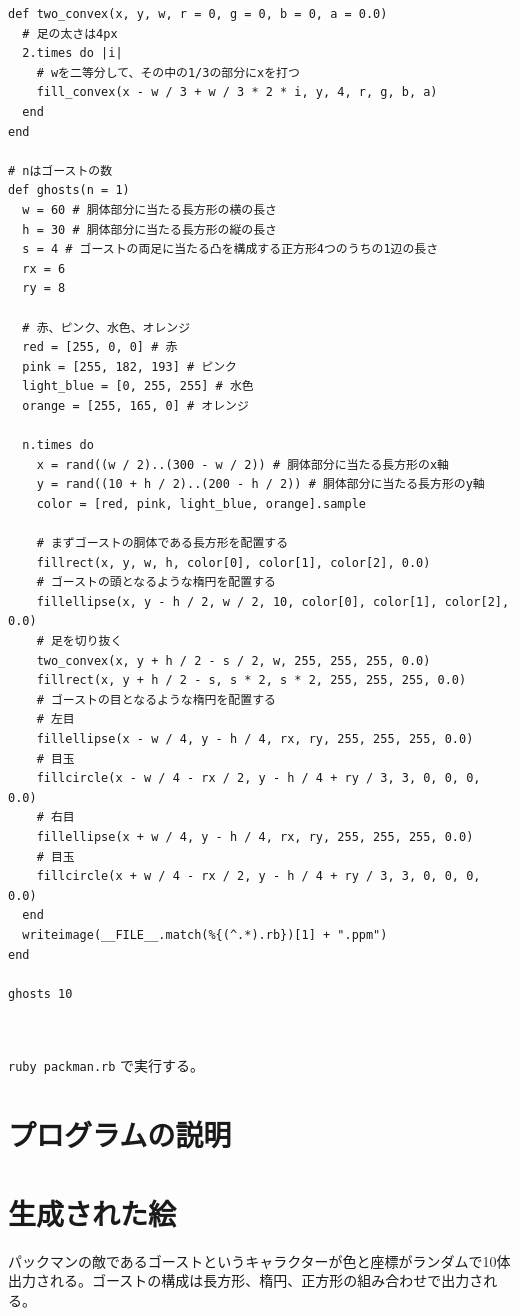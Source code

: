 \documentclass[12pt,a4j]{jarticle}
\begin{document}
\begin{verbatim}
def two_convex(x, y, w, r = 0, g = 0, b = 0, a = 0.0)
  # 足の太さは4px
  2.times do |i|
    # wを二等分して、その中の1/3の部分にxを打つ
    fill_convex(x - w / 3 + w / 3 * 2 * i, y, 4, r, g, b, a)
  end
end

# nはゴーストの数
def ghosts(n = 1)
  w = 60 # 胴体部分に当たる長方形の横の長さ
  h = 30 # 胴体部分に当たる長方形の縦の長さ
  s = 4 # ゴーストの両足に当たる凸を構成する正方形4つのうちの1辺の長さ
  rx = 6
  ry = 8

  # 赤、ピンク、水色、オレンジ
  red = [255, 0, 0] # 赤
  pink = [255, 182, 193] # ピンク
  light_blue = [0, 255, 255] # 水色
  orange = [255, 165, 0] # オレンジ

  n.times do
    x = rand((w / 2)..(300 - w / 2)) # 胴体部分に当たる長方形のx軸
    y = rand((10 + h / 2)..(200 - h / 2)) # 胴体部分に当たる長方形のy軸
    color = [red, pink, light_blue, orange].sample

    # まずゴーストの胴体である長方形を配置する
    fillrect(x, y, w, h, color[0], color[1], color[2], 0.0)
    # ゴーストの頭となるような楕円を配置する
    fillellipse(x, y - h / 2, w / 2, 10, color[0], color[1], color[2], 0.0)
    # 足を切り抜く
    two_convex(x, y + h / 2 - s / 2, w, 255, 255, 255, 0.0)
    fillrect(x, y + h / 2 - s, s * 2, s * 2, 255, 255, 255, 0.0)
    # ゴーストの目となるような楕円を配置する
    # 左目
    fillellipse(x - w / 4, y - h / 4, rx, ry, 255, 255, 255, 0.0)
    # 目玉
    fillcircle(x - w / 4 - rx / 2, y - h / 4 + ry / 3, 3, 0, 0, 0, 0.0)
    # 右目
    fillellipse(x + w / 4, y - h / 4, rx, ry, 255, 255, 255, 0.0)
    # 目玉
    fillcircle(x + w / 4 - rx / 2, y - h / 4 + ry / 3, 3, 0, 0, 0, 0.0)
  end
  writeimage(__FILE__.match(%{(^.*).rb})[1] + ".ppm")
end

ghosts 10



\end{verbatim}

\verb|ruby packman.rb| で実行する。

\section{プログラムの説明}

\section{生成された絵}

パックマンの敵であるゴーストというキャラクターが色と座標がランダムで10体出力される。ゴーストの構成は長方形、楕円、正方形の組み合わせで出力される。
\end{document}

